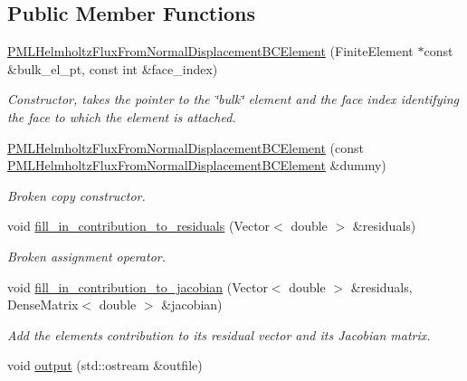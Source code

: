 \subsection*{Public Member Functions}
\begin{DoxyCompactItemize}
\item 
\hyperlink{classoomph_1_1PMLHelmholtzFluxFromNormalDisplacementBCElement_abd57422005608f9ddfccefa73e6d757c}{P\+M\+L\+Helmholtz\+Flux\+From\+Normal\+Displacement\+B\+C\+Element} (Finite\+Element $\ast$const \&bulk\+\_\+el\+\_\+pt, const int \&face\+\_\+index)
\begin{DoxyCompactList}\small\item\em Constructor, takes the pointer to the \char`\"{}bulk\char`\"{} element and the face index identifying the face to which the element is attached. \end{DoxyCompactList}\item 
\hyperlink{classoomph_1_1PMLHelmholtzFluxFromNormalDisplacementBCElement_a4eaae55dc9bd4d6076cf9f6f75f06df3}{P\+M\+L\+Helmholtz\+Flux\+From\+Normal\+Displacement\+B\+C\+Element} (const \hyperlink{classoomph_1_1PMLHelmholtzFluxFromNormalDisplacementBCElement}{P\+M\+L\+Helmholtz\+Flux\+From\+Normal\+Displacement\+B\+C\+Element} \&dummy)
\begin{DoxyCompactList}\small\item\em Broken copy constructor. \end{DoxyCompactList}\item 
void \hyperlink{classoomph_1_1PMLHelmholtzFluxFromNormalDisplacementBCElement_ab43c2c8e318060cf808329b1c147a333}{fill\+\_\+in\+\_\+contribution\+\_\+to\+\_\+residuals} (Vector$<$ double $>$ \&residuals)
\begin{DoxyCompactList}\small\item\em Broken assignment operator. \end{DoxyCompactList}\item 
void \hyperlink{classoomph_1_1PMLHelmholtzFluxFromNormalDisplacementBCElement_a159c7c508fc565f7d70481cd467a5152}{fill\+\_\+in\+\_\+contribution\+\_\+to\+\_\+jacobian} (Vector$<$ double $>$ \&residuals, Dense\+Matrix$<$ double $>$ \&jacobian)
\begin{DoxyCompactList}\small\item\em Add the element\textquotesingle{}s contribution to its residual vector and its Jacobian matrix. \end{DoxyCompactList}\item 
void \hyperlink{classoomph_1_1PMLHelmholtzFluxFromNormalDisplacementBCElement_a64c0556634eed3070ae9a63d2a43efb5}{output} (std\+::ostream \&outfile)

\end{DoxyCompactItemize}
